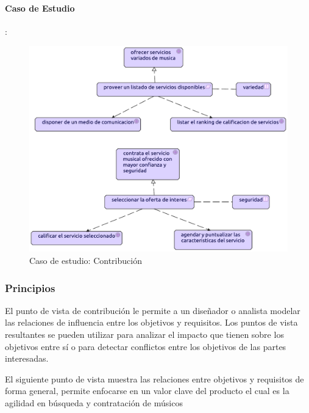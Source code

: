 \paragraph{Caso de Estudio}:
\begin{figure}[h!]
	\centering
	\includegraphics[width=\linewidth]{Desarrollo/ArquitecturaEmpresarial/Motivacion/imgs/Contribucion.pdf}
	\caption{Caso de estudio: Contribución}
	\label{fig:comportamiento}
\end{figure}

\newpage


\subsubsection{Principios}
El punto de vista de contribución le permite a un diseñador o analista modelar las relaciones de influencia entre los objetivos y requisitos. Los puntos de vista resultantes se pueden utilizar para analizar el impacto que tienen sobre los objetivos entre sí o para detectar conflictos entre los objetivos de las partes interesadas.
  \vspace{\baselineskip}

El siguiente punto de vista muestra las relaciones entre objetivos y requisitos de forma general, permite enfocarse en un valor clave del producto el cual es la agilidad en búsqueda y contratación de músicos


